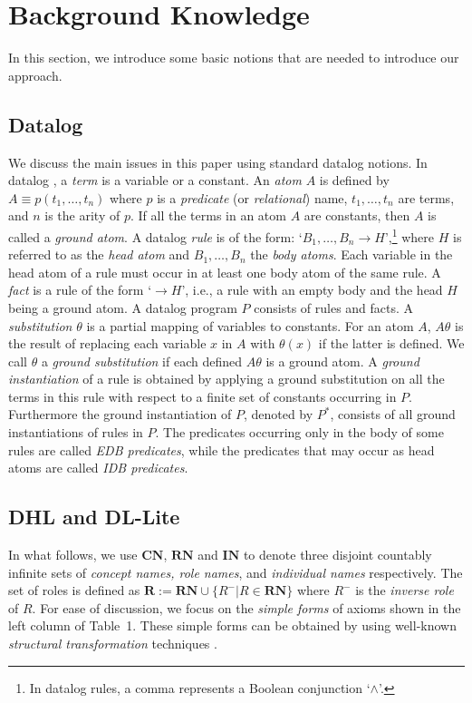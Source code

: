 \section{Background Knowledge}
\label{sec:background}

In this section, we introduce some basic notions that are needed to introduce our approach.


\subsection{Datalog}

We discuss the main issues in this paper using standard datalog notions.
In datalog \cite{database}, a \emph{term} is a variable or a constant. An \emph{atom} $A$
is defined by $A\equiv p(t_1,\ldots,t_n)$ where $p$ is a \emph{predicate} (or \emph{relational})
name, $t_1,\ldots,t_n$ are terms, and $n$ is the arity of $p$. If all the terms in an atom $A$ are
constants, then $A$ is called a \emph{ground atom}.
A datalog \emph{rule} is of the form: `$B_1,\ldots,B_n\rightarrow H$',\footnote{In datalog rules, a comma
represents a Boolean conjunction `$\wedge$'.} where $H$ is referred to as
the \emph{head atom} and $B_1,\ldots,B_n$ the \emph{body atoms}. Each variable in the head atom
of a rule must occur in at least one body atom of the same rule. A \emph{fact} is a rule of
the form `$\rightarrow H$', i.e., a rule with an empty body and the head $H$ being a ground atom.
A datalog program $P$ consists of rules and facts.
A \emph{substitution} $\theta$ is a partial mapping of variables to constants.
For an atom $A$, $A\theta$ is the result of replacing each variable $x$ in $A$
with $\theta(x)$ if the latter is defined. We call $\theta$ a \emph{ground substitution}
if each defined $A\theta$ is a ground atom.
A \emph{ground instantiation} of a rule is obtained by applying a ground substitution on all
the terms in this rule with respect to a finite set of constants occurring in $P$.
Furthermore the ground instantiation of $P$, denoted by $P^*$,
consists of all ground instantiations of rules in $P$.
The predicates occurring only in the body  of some rules are called \emph{EDB predicates},
while the predicates that may occur as head atoms are called \emph{IDB predicates}.


\subsection{DHL and DL-Lite}

In what follows, we use $\textbf{CN}$, $\textbf{RN}$ and $\textbf{IN}$
to denote three disjoint countably
infinite sets of \emph{concept names, role names}, and \emph{individual names} respectively.
The set of roles is defined as $\textbf{R}:=\textbf{RN}\cup\{R^-|R\in\textbf{RN}\}$
where $R^-$ is the \emph{inverse role} of $R$.
For ease of discussion, we focus on the \emph{simple forms} of axioms shown
in the left column of Table~1. These simple forms can be obtained by using
well-known \emph{structural transformation} techniques \cite{KrotzschRH07,Kazakov09}.

